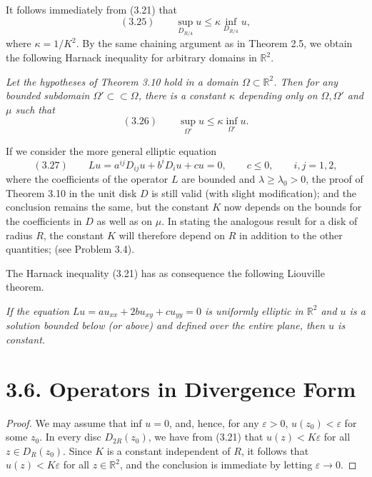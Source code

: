 It follows immediately from (3.21) that
\[
(3.25)\qquad \sup_{D_{R/4}}u\le \kappa\inf_{D_{R/4}}u,
\]
where $\kappa=1/K^2$. By the same chaining argument as in Theorem 2.5, we obtain the following Harnack inequality for arbitrary domains in $\mathbb{R}^2$.

\begin{corollary}\label{gt-ch3-harnack-cor}
\textit{Let the hypotheses of Theorem 3.10 hold in a domain $\Omega\subset \mathbb{R}^2$. Then for any bounded subdomain $\Omega'\subset \subset \Omega$, there is a constant $\kappa$ depending only on $\Omega,\Omega'$ and $\mu$ such that}
\[
(3.26)\qquad \sup_{\Omega'}u\le \kappa\inf_{\Omega'}u.
\]
\end{corollary}

If we consider the more general elliptic equation
\[
(3.27)\qquad Lu=a^{ij}D_{ij}u+b^iD_i u+cu=0,\qquad c\le 0,\qquad i,j=1,2,
\]
where the coefficients of the operator $L$ are bounded and $\lambda\ge \lambda_0>0$, the proof of Theorem 3.10 in the unit disk $D$ is still valid (with slight modification); and the conclusion remains the same, but the constant $K$ now depends on the bounds for the coefficients in $D$ as well as on $\mu$. In stating the analogous result for a disk of radius $R$, the constant $K$ will therefore depend on $R$ in addition to the other quantities; (see Problem 3.4).

The Harnack inequality (3.21) has as consequence the following Liouville theorem.

\begin{corollary}\label{gt-ch3-liouville}
\textit{If the equation $Lu=au_{xx}+2bu_{xy}+cu_{yy}=0$ is uniformly elliptic in $\mathbb{R}^2$ and $u$ is a solution bounded below (or above) and defined over the entire plane, then $u$ is constant.}
\end{corollary}


\section*{3.6. Operators in Divergence Form}

\begin{proof}
We may assume that inf $u=0$, and, hence, for any $\varepsilon>0$, $u(z_0)<\varepsilon$ for some $z_0$. In every disc $D_{2R}(z_0)$, we have from (3.21) that $u(z)<K\varepsilon$ for all $z\in D_R(z_0)$. Since $K$ is a constant independent of $R$, it follows that $u(z)<K\varepsilon$ for all $z\in \mathbb{R}^2$, and the conclusion is immediate by letting $\varepsilon\to 0$. \qedhere
\end{proof}

